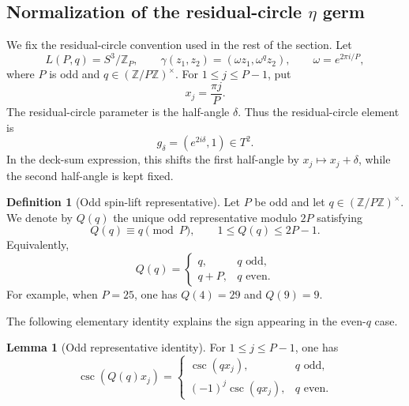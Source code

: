 \documentclass{article}
\theoremstyle{definition}
\newtheorem{lemma}[theorem]{Lemma}
\newtheorem{definition}[theorem]{Definition}
\numberwithin{equation}{section}
\begin{document}
\subsection{Normalization of the residual-circle $\eta$ germ}
\label{subsec:residual-circle-normalization}

We fix the residual-circle convention used in the rest of the section.  Let
\begin{equation}
L(P,q)=S^3/\mathbb Z_P,
\qquad
\gamma(z_1,z_2)=(\omega z_1,\omega^qz_2),
\qquad
\omega=e^{2\pi i/P},
\end{equation}
where $P$ is odd and $q\in(\mathbb Z/P\mathbb Z)^\times$.  For $1\leq j\leq P-1$, put
\begin{equation}
x_j=\frac{\pi j}{P}.
\end{equation}
The residual-circle parameter is the half-angle $\delta$.  Thus the residual-circle element is
\begin{equation}
g_\delta=(e^{2i\delta},1)\in T^2.
\end{equation}
In the deck-sum expression, this shifts the first half-angle by $x_j\mapsto x_j+\delta$, while the second half-angle is kept fixed.

\begin{definition}[Odd spin-lift representative]
Let $P$ be odd and let $q\in(\mathbb Z/P\mathbb Z)^\times$.  We denote by $Q(q)$ the unique odd representative modulo $2P$ satisfying
\begin{equation}
Q(q)\equiv q\pmod P,
\qquad
1\leq Q(q)\leq 2P-1.
\end{equation}
Equivalently,
\begin{equation}
Q(q)=
\begin{cases}
q, & q\text{ odd},\\
q+P, & q\text{ even}.
\end{cases}
\end{equation}
For example, when $P=25$, one has $Q(4)=29$ and $Q(9)=9$.
\end{definition}

The following elementary identity explains the sign appearing in the even-$q$ case.

\begin{lemma}[Odd representative identity]
\label{lem:spin-lift-representative-identity}
For $1\leq j\leq P-1$, one has
\begin{equation}
\csc(Q(q)x_j)=
\begin{cases}
\csc(qx_j), & q\text{ odd},\\
(-1)^j\csc(qx_j), & q\text{ even}.
\end{cases}
\end{equation}
\end{lemma}
\end{document}
